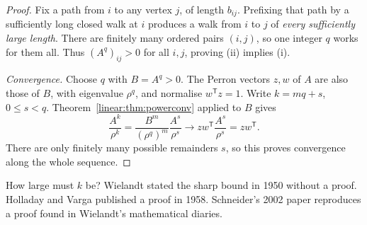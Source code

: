 \begin{proof}
Fix a path from $i$ to any vertex
$j$, of length $b_{ij}$. Prefixing
that path by a sufficiently long
closed walk at $i$ produces
a walk from $i$ to $j$
of \emph{every sufficiently large
length}. There are finitely many
ordered pairs $(i,j)$, so one
integer $q$ works for them all.
Thus $(A^q)_{ij}>0$ for all
$i,j$, proving (ii) implies (i).

\emph{Convergence.}
Choose $q$ with $B=A^q>0$.
The Perron vectors $z,w$ of
$A$ are also those of $B$,
with eigenvalue $\rho^q$,
and normalise $w^{\mathsf T}z=1$.
Write $k=mq+s$, $0\le s<q$.
Theorem~\ref{linear:thm:powerconv}
applied to $B$ gives
\[
\frac{A^k}{\rho^k}
=\frac{B^m}{(\rho^q)^m}
  \frac{A^s}{\rho^s}
\longrightarrow
zw^{\mathsf T}\frac{A^s}{\rho^s}
=zw^{\mathsf T}.
\]
There are only finitely many
possible remainders $s$, so
this proves convergence along
the whole sequence.
\end{proof}

How large must $k$ be? Wielandt stated the sharp bound in 1950 without a
proof. Holladay and Varga published a proof in 1958. Schneider's 2002 paper
reproduces a proof found in Wielandt's mathematical diaries.

